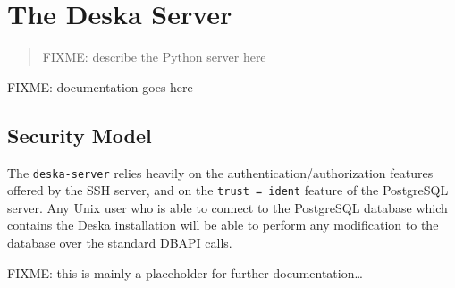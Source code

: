 \documentclass[deska]{subfiles}
\begin{document}
\chapter{The Deska Server}
\label{sec:server-py}

\begin{abstract}
FIXME: describe the Python server here
\end{abstract}

FIXME: documentation goes here

\section{Security Model}
\label{sec:server-security-model}

The {\tt deska-server} relies heavily on the authentication/authorization features offered by the SSH server, and on the
{\tt trust = ident} feature of the PostgreSQL server.  Any Unix user who is able to connect to the PostgreSQL database
which contains the Deska installation will be able to perform any modification to the database over the standard DBAPI
calls.

FIXME: this is mainly a placeholder for further documentation\ldots
\end{document}
